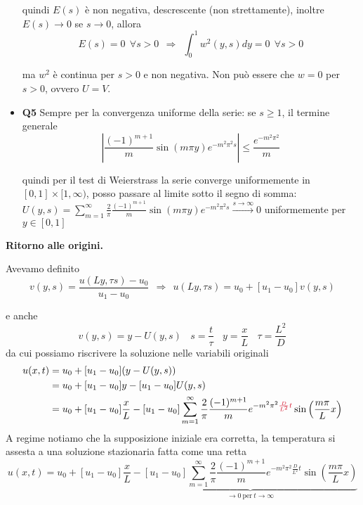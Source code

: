 \documentclass[10pt,a4paper,twoside,openright]{book}
\begin{document}
\begin{itemize}
quindi $E(s)$ è non negativa, descrescente (non strettamente), inoltre $E(s)\rightarrow 0$ se $s\rightarrow 0$, allora\begin{equation*}
E(s) =0\ \ \forall s >0\ \ \Rightarrow \ \ \int ^{1}_{0} w^{2}(y,s) dy=0\ \ \forall s >0
\end{equation*}

ma $w^{2}$ è continua per $s >0$ e non negativa. Non può essere che $w=0$ per $s >0$, ovvero $U=V$.
\item \textbf{Q5} Sempre per la convergenza uniforme della serie: se $\displaystyle s\geqslant 1$, il termine generale \begin{equation*}
\left| \frac{(-1)^{m+1}}{m}\sin(m\pi y) e^{-m^{2} \pi ^{2} s}\right| \leqslant \frac{e^{-m^{2} \pi ^{2}}}{m}
\end{equation*}

quindi per il test di Weierstrass la serie converge uniformemente in $\displaystyle [ 0,1] \times [ 1,\infty)$, posso passare al limite sotto il segno di somma: $\displaystyle U(y,s) =\sum\limits ^{\infty }_{m=1}\frac{2}{\pi }\frac{(-1)^{m+1}}{m}\sin(m\pi y) e^{-m^{2} \pi ^{2} s}\xrightarrow{s\rightarrow \infty } 0$ uniformemente per $\displaystyle y\in [ 0,1]$
\end{itemize}



\textbf{Ritorno alle origini.}

Avevamo definito\begin{equation*}
v(y,s) =\frac{u(Ly,\tau s) -u_{0}}{u_{1} -u_{0}} \ \ \Rightarrow \ \ u(Ly,\tau s) =u_{0} +[ u_{1} -u_{0}] v(y,s)
\end{equation*}

e anche
\begin{equation*}
v(y,s) =y-U(y,s) \ \ \ \ s=\frac{t}{\tau } \ \ \ \ y=\frac{x}{L} \ \ \ \ \tau =\frac{L^{2}}{D}
\end{equation*}
da cui possiamo riscrivere la soluzione nelle variabili originali
\begin{align*}
u(x,t) & =u_{0} +[ u_{1} -u_{0}](y-U(y,s))\\
 & =u_{0} +[ u_{1} -u_{0}] y-[ u_{1} -u_{0}] U(y,s)\\
 & =u_{0} +[ u_{1} -u_{0}]\frac{x}{L} -[ u_{1} -u_{0}]\sum\limits ^{\infty }_{m=1}\frac{2}{\pi }\frac{(-1)^{m+1}}{m} e^{-m^{2} \pi ^{2}\textcolor[rgb]{0.82,0.01,0.11}{\frac{D}{L^{2}}}\textcolor[rgb]{0.82,0.01,0.11}{t}}\sin\left(\frac{m\pi }{L} x\right)
\end{align*}
A regime notiamo che la supposizione iniziale era corretta, la temperatura si assesta a una soluzione stazionaria fatta come una retta
\begin{equation*}
u(x,t) =u_{0} +[ u_{1} -u_{0}]\frac{x}{L} -\underbrace{[ u_{1} -u_{0}]\sum\limits ^{\infty }_{m=1}\frac{2}{\pi }\frac{(-1)^{m+1}}{m} e^{-m^{2} \pi ^{2}\frac{D}{L^{2}} t}\sin\left(\frac{m\pi }{L} x\right)}_{\rightarrow 0\ \text{per} \ t\rightarrow \infty }
\end{equation*}
\end{document}
